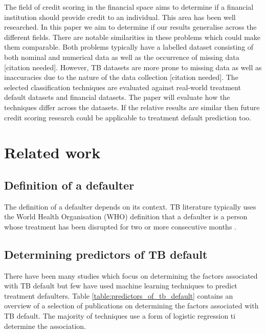 \documentclass{sig-alternate-05-2015}
\begin{document}
	The field of credit scoring in the financial space aims to determine if a financial institution should provide credit to an individual. This area has been well researched. In this paper we aim to determine if our results generalise across the different fields. There are notable similarities in these problems which could make them comparable. Both problems typically have a labelled dataset consisting of both nominal and numerical data as well as the occurrence of missing data [citation needed]. However, TB datasets are more prone to missing data as well as inaccuracies due to the nature of the data collection [citation needed]. The selected classification techniques are evaluated against real-world treatment default datasets and financial datasets. The paper will evaluate how the techniques differ across the datasets. If the relative results are similar then future credit scoring research could be applicable to treatment default prediction too.
	
	\section{Related work}
	\subsection{Definition of a defaulter}
	The definition of a defaulter depends on its context. TB literature typically uses the World Health Organisation (WHO) definition that a defaulter is a person whose treatment has been disrupted for two or more consecutive months \cite{chan:2003prevalence, cherkaoui:19326203, Jha:10.1371/journal.pone.0008873,jittimanee:10.1111/j.1440-172X.2007.00650.x,muture:6660173120110101, world2015TB}.
	
	\subsection{Determining predictors of TB default}
	There have been many studies which focus on determining the factors associated with TB default but few have used machine learning techniques to predict treatment defaulters. Table \ref{table:predictors_of_tb_default} contains an overview of a selection of publications on determining the factors associated with TB default. The majority of techniques use a form of logistic regression ti determine the association. 
	
\end{document}
